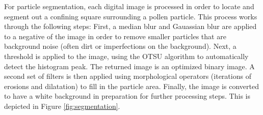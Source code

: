 For particle segmentation, each digital image is processed in order to locate and segment out a confining square surrounding a pollen particle. This process works through the following steps: First, a median blur and Gauassian blur are applied to a negative of the image in order to remove smaller particles that are background noise (often dirt or imperfections on the background). 
Next, a threshold is applied to the image, using the OTSU algorithm to automatically detect the histogram peak. The returned image is an optimized binary image. A second set of filters is then applied using morphological operators (iterations of erosions and dilatation) to fill in the particle area. Finally, the image is converted to have a white background in preparation for further processing steps. This is depicted in Figure \ref{fig:segmentation}.

  
  
  